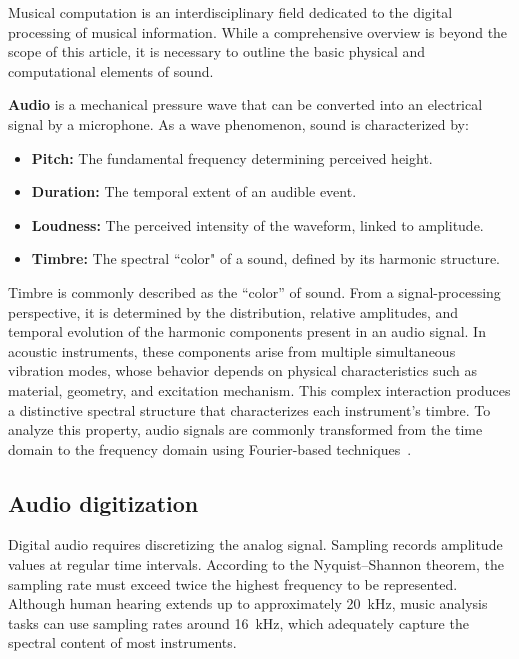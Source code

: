\documentclass[10pt,conference]{IEEEtran}
\begin{document}
Musical computation is an interdisciplinary field dedicated to the digital processing of musical information. While a comprehensive overview is beyond the scope of this article, it is necessary to outline the basic physical and computational elements of sound.

\textbf{Audio} is a mechanical pressure wave that can be converted into an electrical signal by a microphone. As a wave phenomenon, sound is characterized by:

\begin{itemize}
    \item \textbf{Pitch:} The fundamental frequency determining perceived height.
    \item \textbf{Duration:} The temporal extent of an audible event.
    \item \textbf{Loudness:} The perceived intensity of the waveform, linked to amplitude.
    \item \textbf{Timbre:} The spectral “color" of a sound, defined by its harmonic structure.
\end{itemize}

Timbre is commonly described as the ``color'' of sound. From a signal-processing perspective, it is determined by the distribution, relative amplitudes, and temporal evolution of the harmonic components present in an audio signal. In acoustic instruments, these components arise from multiple simultaneous vibration modes, whose behavior depends on physical characteristics such as material, geometry, and excitation mechanism. This complex interaction produces a distinctive spectral structure that characterizes each instrument’s timbre. To analyze this property, audio signals are commonly transformed from the time domain to the frequency domain using Fourier-based techniques~\cite{benson2008music}.

\subsection{Audio digitization}

Digital audio requires discretizing the analog signal. Sampling \cite{po2022sampling} records amplitude values at regular time intervals. According to the Nyquist–Shannon theorem, the sampling rate must exceed twice the highest frequency to be represented. Although human hearing extends up to approximately 20~kHz, music analysis tasks can use sampling rates around 16~kHz, which adequately capture the spectral content of most instruments.
\end{document}
